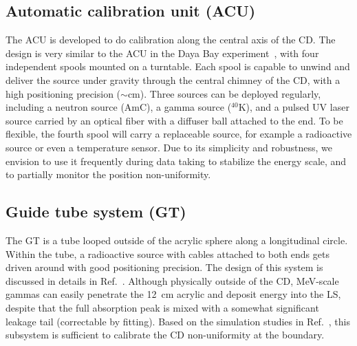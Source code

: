 \documentclass[a4paper,10pt,twoside]{cpc-hepnp}
\begin{document}
\begin{CJK*}{GB}{gbsn}
\begin{multicols}{2}
\subsection{Automatic calibration unit (ACU)}
The ACU is developed to do calibration along the central axis of the
CD. The design is very similar to the ACU in the Daya Bay
experiment~\cite{dayabayACU}, with four independent spools mounted on
a turntable. Each spool is capable to unwind and deliver the source
under gravity through the central chimney of the CD, with a high
positioning precision ($\sim$cm). Three sources can be deployed
regularly, including a neutron source (AmC), a gamma source
($^{40}$K), and a pulsed UV laser source carried by an optical fiber
with a diffuser ball attached to the end. To be flexible, the fourth
spool will carry a replaceable source, for example a radioactive
source or even a temperature sensor. Due to its simplicity and
robustness, we envision to use it frequently during data taking to
stabilize the energy scale, and to partially monitor the position
non-uniformity.

\subsection{Guide tube system (GT)}
The GT is a tube looped outside of the acrylic sphere along a
longitudinal circle. Within the tube, a radioactive source with cables
attached to both ends gets driven around with good positioning
precision. The design of this system is discussed in details in
Ref.~\cite{GTCS}. Although physically outside of the CD, MeV-scale
gammas can easily penetrate the 12~cm acrylic and deposit energy into
the LS, despite that the full absorption peak is mixed with a somewhat
significant leakage tail (correctable by fitting). Based on the
simulation studies in Ref.~\cite{GTCS}, this subsystem is sufficient
to calibrate the CD non-uniformity at the boundary.


\end{multicols}
\end{CJK*}
\end{document}
